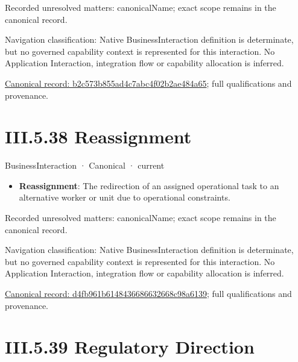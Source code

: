 {\small Recorded unresolved matters: canonicalName; exact scope remains in the canonical record.}\par
{\small Navigation classification: Native BusinessInteraction definition is determinate, but no governed capability context is represented for this interaction. No Application Interaction, integration flow or capability allocation is inferred.}\par
{\footnotesize \href{../../../../../../../continuum/business/business-interaction/b2c573b855ad4c7abc4f02b2ae484a65.md}{Canonical record: b2c573b855ad4c7abc4f02b2ae484a65}; full qualifications and provenance.}\par
\section*{III.5.38 Reassignment}
\label{navigation:III.5.38}

\label{element:d4fb961b6148436686632668c98a6139}
{\small BusinessInteraction · Canonical · current}\par

\begin{itemize}


\item \textbf{Reassignment}: The redirection of an assigned operational task to an alternative worker or unit due to operational constraints.

\end{itemize}

{\small Recorded unresolved matters: canonicalName; exact scope remains in the canonical record.}\par
{\small Navigation classification: Native BusinessInteraction definition is determinate, but no governed capability context is represented for this interaction. No Application Interaction, integration flow or capability allocation is inferred.}\par
{\footnotesize \href{../../../../../../../continuum/business/business-interaction/d4fb961b6148436686632668c98a6139.md}{Canonical record: d4fb961b6148436686632668c98a6139}; full qualifications and provenance.}\par
\section*{III.5.39 Regulatory Direction}
\label{navigation:III.5.39}

